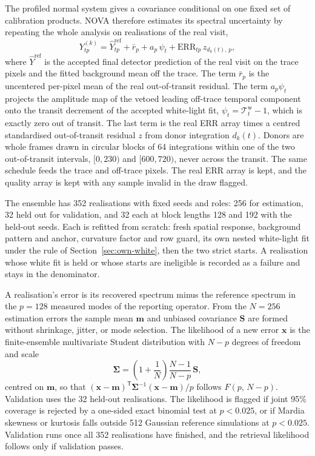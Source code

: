 The profiled normal system gives a covariance conditional on one fixed
set of calibration products. NOVA therefore estimates its spectral
uncertainty by repeating the whole analysis on realisations of the real
visit,
\begin{equation}
 Y^{(k)}_{tp}=\widehat Y^{\mathrm{ref}}_{tp}+\bar r_p+a_p\,\psi_t
 +\mathrm{ERR}_{tp}\,z_{d_k(t),\,p},
 \label{eq:ensemble-draw}
\end{equation}
where $\widehat Y^{\mathrm{ref}}$ is the accepted final detector
prediction of the real visit on the trace pixels and the fitted
background mean off the trace. The term $\bar r_p$ is the uncentered
per-pixel mean of the real out-of-transit residual. The term $a_p\psi_t$
projects the amplitude map of the vetoed leading off-trace temporal
component onto the transit decrement of the accepted white-light fit,
$\psi_t=\mathcal{T}^{\mathrm{w}}_t-1$, which is exactly zero out of
transit. The last term is the real ERR array times a centred
standardised out-of-transit residual $z$ from donor integration
$d_k(t)$. Donors are whole frames drawn in circular blocks of 64
integrations within one of the two out-of-transit intervals, $[0,230)$
and $[600,720)$, never across the transit. The same schedule feeds the
trace and off-trace pixels. The real ERR array is kept, and the quality
array is kept with any sample invalid in the draw flagged.

The ensemble has 352 realisations with fixed seeds and roles: 256 for
estimation, 32 held out for validation, and 32 each at block lengths 128
and 192 with the held-out seeds. Each is refitted from scratch: fresh
spatial response, background pattern and anchor, curvature factor and
row guard, its own nested white-light fit under the rule of
Section~\ref{sec:own-white}, then the two strict starts. A realisation
whose white fit is held or whose starts are ineligible is recorded as a
failure and stays in the denominator.

A realisation's error is its recovered spectrum minus the reference
spectrum in the $p=128$ measured modes of the reporting operator. From
the $N=256$ estimation errors the sample mean $\bm{m}$ and unbiased
covariance $\bm{S}$ are formed without shrinkage, jitter, or mode
selection. The likelihood of a new error $\bm{x}$ is the finite-ensemble
multivariate Student distribution \citep{SellentinHeavens2016} with
$N-p$ degrees of freedom and scale
\begin{equation}
 \bm{\Sigma}=\left(1+\frac{1}{N}\right)\frac{N-1}{N-p}\,\bm{S},
 \label{eq:finite-ensemble}
\end{equation}
centred on $\bm{m}$, so that
$(\bm{x}-\bm{m})^{\mathsf T}\bm{\Sigma}^{-1}(\bm{x}-\bm{m})/p$ follows
$F(p,\,N-p)$. Validation uses the 32 held-out realisations. The
likelihood is flagged if joint 95\% coverage is rejected by a one-sided
exact binomial test at $p<0.025$, or if Mardia skewness or kurtosis
falls outside 512 Gaussian reference simulations at $p<0.025$.
Validation runs once all 352 realisations have finished, and the
retrieval likelihood follows only if validation passes.

